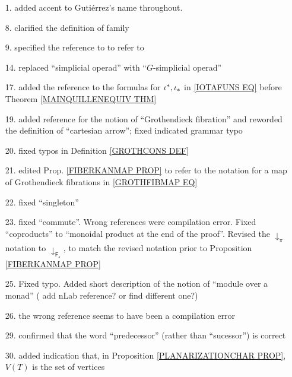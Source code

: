 \documentclass{article}
\begin{document}
\begin{itemize}
\item[1.] added accent to Guti\'{e}rrez's name throughout.

\item[8.] clarified the definition of family

\item[9.] specified the reference to 
\cite{Elm83}
to refer to
\cite[\S 3]{Elm83}

\item[14.] replaced ``simplicial operad'' with  ``$G$-simplicial operad''
      
\item[17.] 
added the reference to the formulas for 
$\iota^{\**},\iota_{\**}$
in \eqref{IOTAFUNS EQ} 
before Theorem \ref{MAINQUILLENEQUIV THM}

\item[19.] added reference for the notion of ``Grothendieck fibration'' and reworded the definition of ``cartesian arrow''; fixed indicated grammar typo

\item[20.] fixed typos in Definition \ref{GROTHCONS DEF}

\item[21.] edited Prop. \ref{FIBERKANMAP PROP} to refer to the notation for a map of Grothendieck fibrations in \eqref{GROTHFIBMAP EQ}

\item[22.] fixed ``singleton''

\item[23.] fixed ``commute''. Wrong references were compilation error.
Fixed ``coproducts'' to ``monoidal product at the end of the proof''. Revised the $\downarrow_{\pi}$ notation to 
$\downarrow_{\mathsf{F}_s}$, 
to match the revised notation prior to 
Proposition \ref{FIBERKANMAP PROP}


\item[25.] Fixed typo. Added short description of the notion of ``module over a monad'' ({\color{red} add nLab reference? or find different one?})

\item[26.] the wrong reference seems to have been a compilation error

\item[29.] confirmed that the word ``predecessor'' (rather than ``sucessor'') is correct

\item[30.] added indication that, 
in Proposition \ref{PLANARIZATIONCHAR PROP},
$V(T)$ is the set of vertices


\end{itemize}
\end{document}
